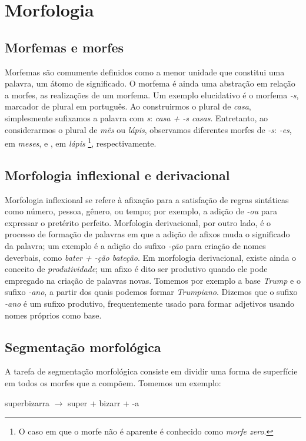 \documentclass[cic,tc]{iiufrgs}
\begin{document}
\section{Morfologia}
\subsection{Morfemas e morfes}
Morfemas são comumente definidos como a menor unidade que constitui uma palavra, um átomo de significado. O morfema é ainda uma abstração em relação a morfes, as realizações de um morfema. Um exemplo elucidativo é o morfema \emph{-s}, marcador de plural em português. Ao construirmos o plural de \emph{casa}, simplesmente sufixamos a palavra com \emph{s}: \emph{casa + -s \rightarrow{} casas}. Entretanto, ao considerarmos o plural de \emph{mês} ou \emph{lápis}, observamos diferentes morfes de \emph{-s}: \emph{-es}, em \emph{meses}, e \varnothing{}, em \emph{lápis} \footnote{O caso em que o morfe não é aparente é conhecido como \emph{morfe zero}.}, respectivamente.

\subsection{Morfologia inflexional e derivacional}
Morfologia inflexional se refere à afixação para a satisfação de regras sintáticas como número, pessoa, gênero, ou tempo; por exemplo, a adição de \emph{-ou} para expressar o pretérito perfeito. Morfologia derivacional, por outro lado, é o processo de formação de palavras em que a adição de afixos muda o significado da palavra; um exemplo é a adição do sufixo \emph{-ção} para criação de nomes deverbais, como \emph{bater + -ção \rightarrow{} bateção}. Em morfologia derivacional, existe ainda o conceito de \emph{produtividade}; um afixo é dito ser produtivo quando ele pode empregado na criação de palavras novas. Tomemos por exemplo a base \emph{Trump} e o sufixo \emph{-ano}, a partir dos quais podemos formar \emph{Trumpiano}. Dizemos que o sufixo \emph{-ano} é um sufixo produtivo, frequentemente usado para formar adjetivos usando nomes próprios como base. 

\subsection{Segmentação morfológica}
A tarefa de segmentação morfológica consiste em dividir uma forma de superfície em todos os morfes que a compõem. Tomemos um exemplo:

\begin{center}
    superbizarra $\rightarrow$ super + bizarr + -a
\end{center}
\end{document}
